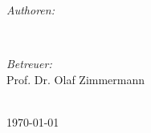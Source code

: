 \begin{titlepage}
\begin{minipage}{0.45\textwidth}
\begin{flushleft} \large
\emph{Authoren:}\\
\@author
\end{flushleft}
\end{minipage}
~
\begin{minipage}{0.45\textwidth}
\begin{flushright} \large
\emph{Betreuer:} \\
Prof. Dr. Olaf Zimmermann \\[1.2em] %
\end{flushright}
\end{minipage}\\[0.7cm]

\vspace{0.2cm}
{\large \today}\\[1cm] %

\vfill %

\end{titlepage}